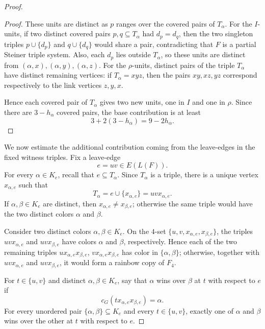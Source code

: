 \documentclass[10pt,a4paper]{article}
\theoremstyle{definition}
\begin{document}
\begin{proof}
\begin{proof}
        These units are distinct as $p$ ranges over the covered pairs of
        $T_\alpha$.  For the $I$-units, if two distinct covered pairs
        $p,q\subseteq T_\alpha$ had $d_p=d_q$, then the two singleton triples $p\cup\{d_p\}$ and $q\cup\{d_q\}$ would share a pair, contradicting that $F$ is a partial Steiner triple
        system.  Also, each $d_p$ lies outside $T_\alpha$, so these units are
        distinct from $(\alpha,x),(\alpha,y),(\alpha,z)$.  For the
        $\rho$-units, distinct pairs of the triple $T_\alpha$ have distinct
        remaining vertices: if $T_\alpha=xyz$, then the pairs $xy,xz,yz$
        correspond respectively to the link vertices $z,y,x$.

        Hence each covered pair of $T_\alpha$ gives two new units, one in $I$
        and one in $\rho$.  Since there are $3-h_\alpha$ covered pairs, the
        base contribution is at least
        \[
            3+2(3-h_\alpha)=9-2h_\alpha.
        \]
    \end{proof}

    We now estimate the additional contribution coming from the leave-edges in the fixed witness triples.  Fix a leave-edge
    \[
        e=uv\in E(L(F)).
    \]
    For every $\alpha\in K_e$, recall that $e\subseteq T_\alpha$.  Since
    $T_\alpha$ is a triple, there is a unique vertex $x_{\alpha,e}$ such that
    \[
        T_\alpha=e\cup\{x_{\alpha,e}\}=uvx_{\alpha,e}.
    \]
    If $\alpha,\beta\in K_e$ are distinct, then
    $x_{\alpha,e}\ne x_{\beta,e}$; otherwise the same triple would have the
    two distinct colors $\alpha$ and $\beta$.

    Consider two distinct colors $\alpha,\beta\in K_e$.  On the $4$-set $\{u,v,x_{\alpha,e},x_{\beta,e}\}$, the triples $uvx_{\alpha,e}$ and $uvx_{\beta,e}$ have colors $\alpha$ and
    $\beta$, respectively.
    Hence each of the two remaining triples $ux_{\alpha,e}x_{\beta,e}$, $vx_{\alpha,e}x_{\beta,e}$ has color in $\{\alpha,\beta\}$; otherwise, together with
    $uvx_{\alpha,e}$ and $uvx_{\beta,e}$, it would form a rainbow copy of
    $F_4$.

    For $t\in\{u,v\}$ and distinct $\alpha,\beta\in K_e$, say that
    $\alpha$ wins over $\beta$ at $t$ with respect to $e$ if
    \[
        c_G(tx_{\alpha,e}x_{\beta,e})=\alpha.
    \]
    For every unordered pair $\{\alpha,\beta\}\subseteq K_e$ and every
    $t\in\{u,v\}$, exactly one of $\alpha$ and $\beta$ wins over the other at
    $t$ with respect to $e$.


\end{proof}
\end{document}
